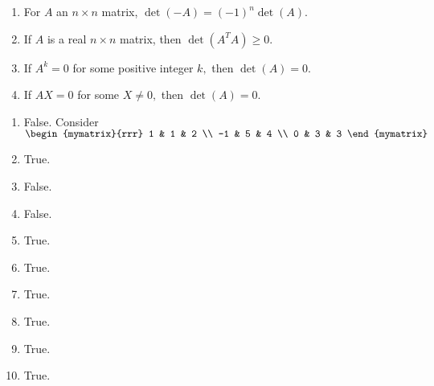 \begin{enumialphparenastyle}
\begin{ex}
\begin{enumerate}
\item For $A$ an $n\times n$ matrix, $\det \left( -A\right) =\left(
-1\right) ^{n}\det \left( A\right) .$

\item If $A$ is a real $n\times n$ matrix, then $\det \left( A^{T}A\right)
\geq 0.$

\item If $A^{k}=0$ for some positive integer $k,$ then $\det \left(
A\right) =0.$

\item If $AX=0$ for some $X \neq 0,$ then $\det \left(
A\right) =0.$
\end{enumerate}
\begin{sol}
\begin{enumerate}
\item False. Consider $\begin{mymatrix}{rrr}
1 & 1 & 2 \\
-1 & 5 & 4 \\
0 & 3 & 3
\end{mymatrix} $
\item True.
\item False.
\item False.
\item True.
\item True.
\item True.
\item True.
\item True.
\item True.
\end{enumerate}
\end{sol}
\end{ex}

\end{enumialphparenastyle}